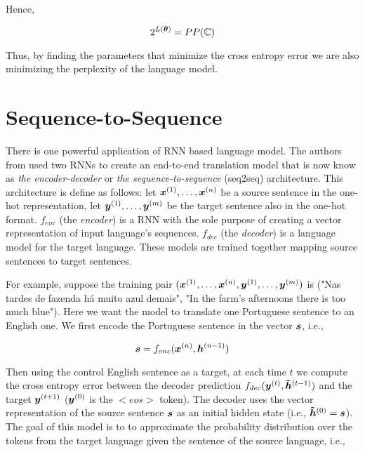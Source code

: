 Hence,

\begin{equation}
2^{L(\bm{\theta})} = PP(\mathbb{C})
\end{equation}

Thus, by finding the parameters that minimize the cross entropy error we are also minimizing the perplexity of the language model. 

\section{Sequence-to-Sequence}
\label{sec:Seq2seq}

There is one powerful application of RNN based language model. The authors from \cite{Sustskever} used two RNNs to create an end-to-end translation model that is now know as \textit{the encoder-decoder} or \textit{the sequence-to-sequence} (seq2seq) architecture. This architecture is define as follows: let $\bm{x}^{(1)}, \dots, \bm{x}^{(n)}$ be a source sentence in the one-hot representation,  let $\bm{y}^{(1)}, \dots, \bm{y}^{(m)}$ be the target sentence also in the one-hot format. $f_{enc}$ (the \textit{encoder}) is a RNN with the sole purpose of creating a vector representation of input language's sequences. $f_{dec}$ (the \textit{decoder}) is a language model for the target language. These models are trained together mapping source sentences to target sentences.

For example, suppose the training pair $(\bm{x}^{(1)}, \dots, \bm{x}^{(n)}, \bm{y}^{(1)}, \dots, \bm{y}^{(m)})$ is ("Nas tardes de fazenda há muito azul demais", "In the farm’s afternoons there is too much blue"). Here we want the model to translate one Portuguese sentence to an English one. We first encode the Portuguese sentence in the vector $\bm{s}$, i.e.,

\begin{equation}
\bm{s} = f_{enc}(\bm{x}^{(n)}, \bm{h}^{(n-1)})
\end{equation}

Then using the control English sentence as a target, at each time $t$ we compute the cross entropy error between the decoder prediction $f_{dec}(\bm{y}^{(t)}, \bm{\tilde{h}}^{(t-1)})$ and the target $\bm{y}^{(t+1)}$ ($\bm{y}^{(0)}$ is the $<eos>$ token). The decoder uses the vector representation of the source sentence $\bm{s}$ as an initial hidden state (i.e., $\bm{\tilde{h}}^{(0)} = \bm{s}$). The goal of this model is to to approximate the probability distribution over the tokens from the target language given the sentence of the source language, i.e.,

